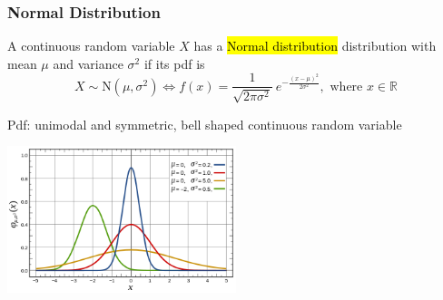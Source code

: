 \documentclass[slidestop,compress,mathserif]{beamer}
\begin{document}
\begin{frame}
\frametitle{Normal Distribution}

\vspace{-0.2cm}
\begin{defn}
A continuous random variable $X$ has a \hl{Normal distribution} distribution with mean $\mu$ and variance $\sigma^2$ if its pdf is
\[
X \sim \text{N}(\mu, \sigma^2) \Longleftrightarrow
 f(x) = \frac{1}{\sqrt{2\pi\sigma^2}}~e^{ -\frac{(x-\mu)^2}{2\sigma^2} }, \text{ where } x \in \mathbb{R}
\]
\end{defn}

\pause
Pdf: unimodal and symmetric, bell shaped continuous random variable
\begin{center}
\includegraphics[width = 0.5\textwidth]{figures/normal_pdf}
\end{center}

\end{frame}


%
%
\end{document}
